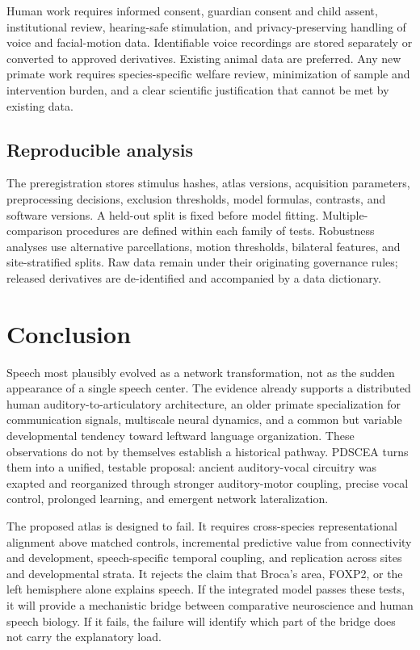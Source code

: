 \documentclass[conference]{IEEEtran}
\begin{document}
Human work requires informed consent, guardian consent and child assent, institutional review, hearing-safe stimulation, and privacy-preserving handling of voice and facial-motion data. Identifiable voice recordings are stored separately or converted to approved derivatives. Existing animal data are preferred. Any new primate work requires species-specific welfare review, minimization of sample and intervention burden, and a clear scientific justification that cannot be met by existing data.

\subsection{Reproducible analysis}

The preregistration stores stimulus hashes, atlas versions, acquisition parameters, preprocessing decisions, exclusion thresholds, model formulas, contrasts, and software versions. A held-out split is fixed before model fitting. Multiple-comparison procedures are defined within each family of tests. Robustness analyses use alternative parcellations, motion thresholds, bilateral features, and site-stratified splits. Raw data remain under their originating governance rules; released derivatives are de-identified and accompanied by a data dictionary.

\section{Conclusion}

Speech most plausibly evolved as a network transformation, not as the sudden appearance of a single speech center. The evidence already supports a distributed human auditory-to-articulatory architecture, an older primate specialization for communication signals, multiscale neural dynamics, and a common but variable developmental tendency toward leftward language organization. These observations do not by themselves establish a historical pathway. PDSCEA turns them into a unified, testable proposal: ancient auditory-vocal circuitry was exapted and reorganized through stronger auditory-motor coupling, precise vocal control, prolonged learning, and emergent network lateralization.

The proposed atlas is designed to fail. It requires cross-species representational alignment above matched controls, incremental predictive value from connectivity and development, speech-specific temporal coupling, and replication across sites and developmental strata. It rejects the claim that Broca's area, FOXP2, or the left hemisphere alone explains speech. If the integrated model passes these tests, it will provide a mechanistic bridge between comparative neuroscience and human speech biology. If it fails, the failure will identify which part of the bridge does not carry the explanatory load.
\end{document}
